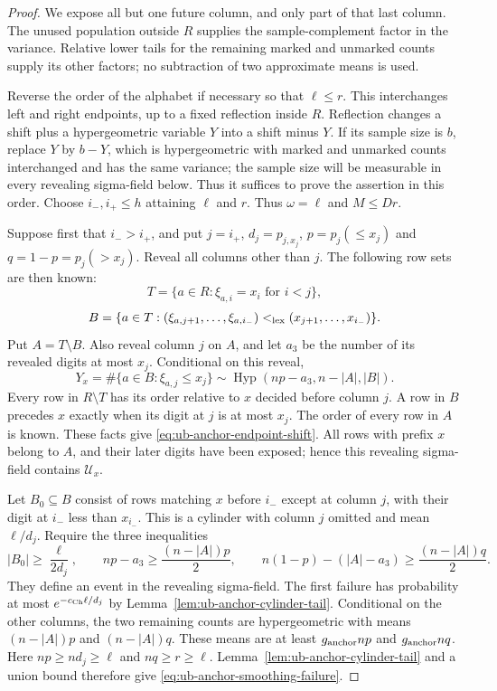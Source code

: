 \documentclass[11pt]{article}
\numberwithin{equation}{section}
\newcommand{\1}{\mathbf 1}
\begin{document}
\begin{proof}
We expose all but one future column, and only part of that last column.
The unused population outside $R$ supplies the sample-complement
factor in the variance.  Relative lower tails for the remaining
marked and unmarked counts supply its other factors; no subtraction
of two approximate means is used.

Reverse the order of the alphabet if necessary so that
$\ell\le r$.  This interchanges left and right endpoints, up to a
fixed reflection inside $R$.  Reflection changes a shift plus a
hypergeometric variable $Y$ into a shift minus $Y$.  If its sample
size is $b$, replace $Y$ by $b-Y$, which is hypergeometric with
marked and unmarked counts interchanged and has the same variance;
the sample size will be measurable in every revealing sigma-field
below.  Thus it suffices to prove the assertion in this order.
Choose $i_-,i_+\le h$ attaining $\ell$ and $r$.
Thus $\omega=\ell$ and $M\le Dr$.

Suppose first that $i_->i_+$, and put $j=i_+$,
$d_j=p_{j,x_j}$, $p=p_j(\le x_j)$ and $q=1-p=p_j(>x_j)$.
Reveal all columns other than $j$.  The following row sets are then
known:
\[
 T=\{a\in R:\xi_{a,i}=x_i\text{ for }i<j\},
\]
\[
 B=\{a\in T:(\xi_{a,j+1},\ldots,\xi_{a,i_-})
                    <_{\rm lex}(x_{j+1},\ldots,x_{i_-})\}.
\]
Put $A=T\setminus B$.  Also reveal column $j$ on $A$, and let $a_3$ be the number of its
revealed digits at most $x_j$.  Conditional on this reveal,
\begin{equation}
\label{eq:ub-anchor-hyp-case-right}
 Y_x=\#\{a\in B:\xi_{a,j}\le x_j\}
 \sim\operatorname{Hyp}(np-a_3,n-|A|,|B|).
\end{equation}
Every row in $R\setminus T$ has its order relative to $x$ decided
before column $j$.  A row in $B$ precedes $x$ exactly when its digit
at $j$ is at most $x_j$.  The order of every row in $A$ is known.
These facts give \eqref{eq:ub-anchor-endpoint-shift}.  All rows with
prefix $x$ belong to $A$, and their later digits have been exposed;
hence this revealing sigma-field contains $\mathcal U_x$.

Let $B_0\subseteq B$ consist of rows matching $x$ before $i_-$ except
at column $j$, with their digit at $i_-$ less than $x_{i_-}$.
This is a cylinder with column $j$ omitted and mean $\ell/d_j$.
Require the three inequalities
\[
 |B_0|\ge\frac{\ell}{2d_j},\qquad
 np-a_3\ge\frac{(n-|A|)p}{2},\qquad
 n(1-p)-(|A|-a_3)\ge\frac{(n-|A|)q}{2}.
\]
They define an event in the revealing sigma-field.  The first failure
has probability at most $e^{-c_{\rm Ch}\ell/d_j}$ by
Lemma~\ref{lem:ub-anchor-cylinder-tail}.  Conditional on the other
columns, the two remaining counts are hypergeometric with means
$(n-|A|)p$ and $(n-|A|)q$.  These means are at least
$g_{\rm anchor}np$ and $g_{\rm anchor}nq$.
Here $np\ge nd_j\ge\ell$ and $nq\ge r\ge\ell$.
Lemma~\ref{lem:ub-anchor-cylinder-tail} and a union bound therefore
give \eqref{eq:ub-anchor-smoothing-failure}.


\end{proof}
\end{document}
